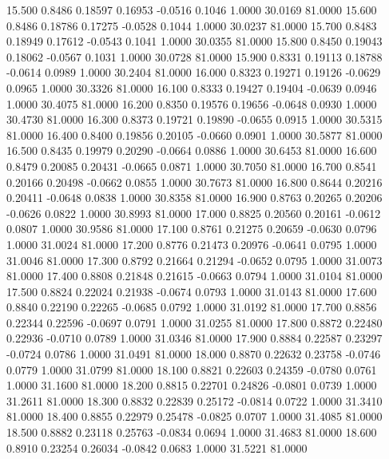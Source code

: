   15.500   0.8486   0.18597   0.16953  -0.0516   0.1046   1.0000  30.0169  81.0000
  15.600   0.8486   0.18786   0.17275  -0.0528   0.1044   1.0000  30.0237  81.0000
  15.700   0.8483   0.18949   0.17612  -0.0543   0.1041   1.0000  30.0355  81.0000
  15.800   0.8450   0.19043   0.18062  -0.0567   0.1031   1.0000  30.0728  81.0000
  15.900   0.8331   0.19113   0.18788  -0.0614   0.0989   1.0000  30.2404  81.0000
  16.000   0.8323   0.19271   0.19126  -0.0629   0.0965   1.0000  30.3326  81.0000
  16.100   0.8333   0.19427   0.19404  -0.0639   0.0946   1.0000  30.4075  81.0000
  16.200   0.8350   0.19576   0.19656  -0.0648   0.0930   1.0000  30.4730  81.0000
  16.300   0.8373   0.19721   0.19890  -0.0655   0.0915   1.0000  30.5315  81.0000
  16.400   0.8400   0.19856   0.20105  -0.0660   0.0901   1.0000  30.5877  81.0000
  16.500   0.8435   0.19979   0.20290  -0.0664   0.0886   1.0000  30.6453  81.0000
  16.600   0.8479   0.20085   0.20431  -0.0665   0.0871   1.0000  30.7050  81.0000
  16.700   0.8541   0.20166   0.20498  -0.0662   0.0855   1.0000  30.7673  81.0000
  16.800   0.8644   0.20216   0.20411  -0.0648   0.0838   1.0000  30.8358  81.0000
  16.900   0.8763   0.20265   0.20206  -0.0626   0.0822   1.0000  30.8993  81.0000
  17.000   0.8825   0.20560   0.20161  -0.0612   0.0807   1.0000  30.9586  81.0000
  17.100   0.8761   0.21275   0.20659  -0.0630   0.0796   1.0000  31.0024  81.0000
  17.200   0.8776   0.21473   0.20976  -0.0641   0.0795   1.0000  31.0046  81.0000
  17.300   0.8792   0.21664   0.21294  -0.0652   0.0795   1.0000  31.0073  81.0000
  17.400   0.8808   0.21848   0.21615  -0.0663   0.0794   1.0000  31.0104  81.0000
  17.500   0.8824   0.22024   0.21938  -0.0674   0.0793   1.0000  31.0143  81.0000
  17.600   0.8840   0.22190   0.22265  -0.0685   0.0792   1.0000  31.0192  81.0000
  17.700   0.8856   0.22344   0.22596  -0.0697   0.0791   1.0000  31.0255  81.0000
  17.800   0.8872   0.22480   0.22936  -0.0710   0.0789   1.0000  31.0346  81.0000
  17.900   0.8884   0.22587   0.23297  -0.0724   0.0786   1.0000  31.0491  81.0000
  18.000   0.8870   0.22632   0.23758  -0.0746   0.0779   1.0000  31.0799  81.0000
  18.100   0.8821   0.22603   0.24359  -0.0780   0.0761   1.0000  31.1600  81.0000
  18.200   0.8815   0.22701   0.24826  -0.0801   0.0739   1.0000  31.2611  81.0000
  18.300   0.8832   0.22839   0.25172  -0.0814   0.0722   1.0000  31.3410  81.0000
  18.400   0.8855   0.22979   0.25478  -0.0825   0.0707   1.0000  31.4085  81.0000
  18.500   0.8882   0.23118   0.25763  -0.0834   0.0694   1.0000  31.4683  81.0000
  18.600   0.8910   0.23254   0.26034  -0.0842   0.0683   1.0000  31.5221  81.0000

